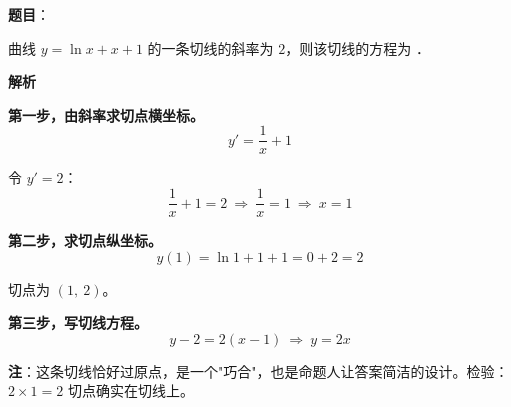 \begin{answer}

\textbf{题目}：

曲线 $y=\ln x+x+1$ 的一条切线的斜率为 $2$，则该切线的方程为 \gkblank{}．

\textbf{解析}

\textbf{第一步，由斜率求切点横坐标。}
\nopagebreak[4]
\[y'=\frac1x+1\]

令 $y'=2$：
\nopagebreak[4]
\[\frac1x+1=2\ \Longrightarrow\ \frac1x=1\ \Longrightarrow\ x=1\]

\textbf{第二步，求切点纵坐标。}
\nopagebreak[4]
\[y(1)=\ln1+1+1=0+2=2\]

切点为 $(1,\ 2)$。

\textbf{第三步，写切线方程。}
\nopagebreak[4]
\[y-2=2(x-1)\ \Longrightarrow\ y=2x\]

\begin{gktip}
\textbf{注}：这条切线恰好过原点，是一个"巧合"，也是命题人让答案简洁的设计。检验：$2\times1=2$  切点确实在切线上。
\end{gktip}


\par\medskip

\end{answer}
